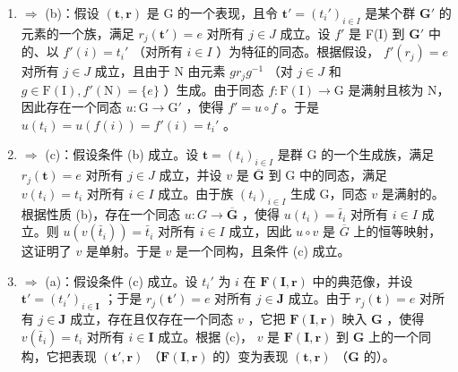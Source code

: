 \begin{enumerate}
\def\labelenumi{(\alph{enumi})}
\item
  \(\Rightarrow\) (b)：假设 \((\mathbf{t},\mathbf{r})\) 是 G 的一个表现，且令 \(\mathbf{t}' = (t_i')_{i\in I}\) 是某个群 \(\mathbf{G}'\) 的元素的一个族，满足 \(r_j(\mathbf{t}') = e\) 对所有 \(j\in J\) 成立。设 \(f'\) 是 F(I) 到 \(\mathbf{G}'\) 中的、以 \(f'(i) = t_i'\) （对所有 \(i\in I\) ）为特征的同态。根据假设， \(f'(r_j) = e\) 对所有 \(j\in J\) 成立，且由于 N 由元素 \(gr_jg^{-1}\) （对 \(j\in J\) 和 \(g\in \mathrm{F}(\mathrm{I}),f'(\mathrm{N}) = \{e\}\) ）生成。由于同态 \(f\colon \mathrm{F}(\mathrm{I})\to \mathrm{G}\) 是满射且核为 N，因此存在一个同态 \(u\colon \mathrm{G}\to \mathrm{G}'\) ，使得 \(f' = u\circ f\) 。于是 \(u(t_i) = u(f(i)) = f'(i) = t_i'\) 。
\item
  \(\Rightarrow\) (c)：假设条件 (b) 成立。设 \(\mathbf{t} = (t_i)_{i\in I}\) 是群 G 的一个生成族，满足 \(r_j(\mathbf{t}) = e\) 对所有 \(j\in J\) 成立，并设 \(v\) 是 \(\overline{\mathbf{G}}\) 到 G 中的同态，满足 \(v(t_i) = t_i\) 对所有 \(i\in I\) 成立。由于族 \((t_i)_{i\in I}\) 生成 G，同态 \(v\) 是满射的。根据性质 (b)，存在一个同态 \(u\colon G\to \overline{\mathbf{G}}\) ，使得 \(u(t_i) = \bar{t}_i\) 对所有 \(i\in I\) 成立。则 \(u(v(\bar{t}_i)) = \bar{t}_i\) 对所有 \(i\in I\) 成立，因此 \(u \circ v\) 是 \(\overline{G}\) 上的恒等映射，这证明了 \(v\) 是单射。于是 \(v\) 是一个同构，且条件 (c) 成立。
\item
  \(\Rightarrow\) (a)：假设条件 (c) 成立。设 \(t_i'\) 为 \(i\) 在 \(\mathbf{F}(\mathbf{I},\mathbf{r})\) 中的典范像，并设 \(\mathbf{t}' = (t_i')_{i\in \mathbf{I}}\) ；于是 \(r_j(\mathbf{t}') = e\) 对所有 \(j\in \mathbf{J}\) 成立。由于 \(r_j(\mathbf{t}) = e\) 对所有 \(j\in \mathbf{J}\) 成立，存在且仅存在一个同态 \(v\) ，它把 \(\mathbf{F}(\mathbf{I},\mathbf{r})\) 映入 \(\mathbf{G}\) ，使得 \(v(\bar{t}_i) = t_i\) 对所有 \(i\in \mathbf{I}\) 成立。根据 (c)， \(v\) 是 \(\mathbf{F}(\mathbf{I},\mathbf{r})\) 到 \(\mathbf{G}\) 上的一个同构，它把表现 \((\mathbf{t}',\mathbf{r})\) （\(\mathbf{F}(\mathbf{I},\mathbf{r})\) 的）变为表现 \((\mathbf{t},\mathbf{r})\) （\(\mathbf{G}\) 的）。
\end{enumerate}

